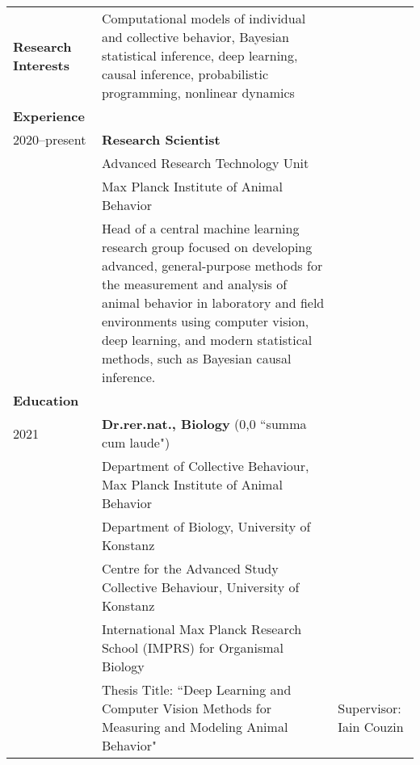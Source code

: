 \documentclass[letterpaper,10pt,oneside]{article}
\newcommand{\tabitem}{\hspace{2mm}\textbullet\hspace{2mm}}
\begin{document}
\begin{small}
\noindent \begin{longtable}{@{} l p{5in}l}

\large{\textbf{Research Interests}}
& Computational models of individual and collective behavior, Bayesian statistical inference, deep learning, causal inference, probabilistic programming, nonlinear dynamics \vspace{2mm}\\ 

\Large{\textbf{Experience}} \vspace{2mm} \\
\large{2020--present} 
& \textbf{Research Scientist} \\
& {Advanced Research Technology Unit} \\
& {Max Planck Institute of Animal Behavior} \\
& \tabitem Head of a central machine learning research group focused on developing advanced, general-purpose methods for the measurement and analysis of animal behavior in laboratory and field environments using computer vision, deep learning, and modern statistical methods, such as Bayesian causal inference.\vspace{5mm} \\

\Large{\textbf{Education}} \vspace{2mm} \\
 \large{2021} 
 & \textbf{Dr.rer.nat., Biology} (0,0 ``summa cum laude")\\
  &   {Department of Collective Behaviour, Max Planck Institute of Animal Behavior} \\
 &   {Department of Biology, University of Konstanz} \\
 &  {Centre for the Advanced Study Collective Behaviour, University of Konstanz} \\
 &   {International Max Planck Research School (IMPRS) for Organismal Biology} \\
 & \tabitem Thesis Title: ``Deep Learning and Computer Vision Methods for Measuring and Modeling Animal Behavior" \vspace{2mm} 
 & Supervisor: Iain Couzin\\


\end{longtable}
\end{small}
\end{document}
